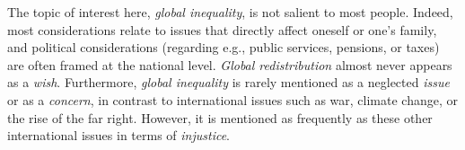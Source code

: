 \documentclass[12pt,english]{article}
\begin{document}

The topic of interest here, \textit{global inequality}, is not salient to most people. Indeed, most considerations relate to issues that directly affect oneself or one's family, and political considerations (regarding e.g., public services, pensions, or taxes) are often framed at the national level. \textit{Global redistribution} almost never appears as a \textit{wish}. Furthermore, \textit{global inequality} is rarely mentioned as a neglected \textit{issue} or as a \textit{concern}, in contrast to international issues such as war, climate change, or the rise of the far right. However, it is mentioned as frequently as these other international issues in terms of \textit{injustice}. 
\end{document}
